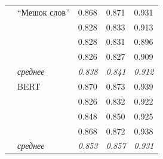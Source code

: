 \begin{table}[H]
\begin{center}
\begin{tabular}{|p{3cm}|p{4cm}|p{2.4cm}|p{2.4cm}|p{2.4cm}|}
			\multirow{8}{*}{\shortstack[l]{Перцептрон}} 
& ``Мешок слов'' & 0.868 & 0.871 & 0.931 \\
				&& 0.828 & 0.833 & 0.913 \\
				&& 0.828 & 0.831 & 0.896 \\
				&& 0.826 & 0.827 & 0.909 \\
				\cline{2-5} & \textit{среднее} & \textit{0.838} & \textit{0.841} & \textit{0.912} \\
			\cline{2-5}
		  & BERT & 0.870 & 0.873 & 0.939 \\
				&& 0.826 & 0.832 & 0.922 \\
				&& 0.848 & 0.850 & 0.925 \\
				&& 0.868 & 0.872 & 0.938 \\
				\cline{2-5} & \textit{среднее} & \textit{0.853} & \textit{0.857} & \textit{0.931} \\
					
			\hline
		\end{tabular}
	\end{center}
\end{table}